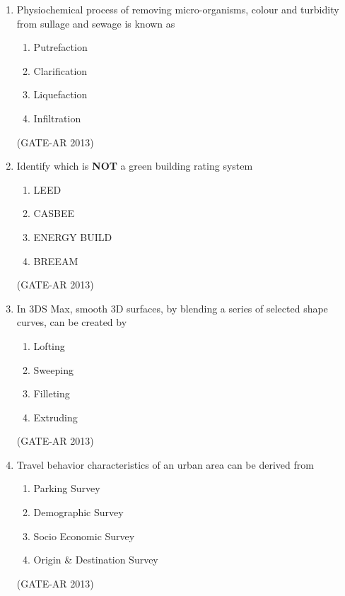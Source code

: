 \documentclass[a4paper,10pt]{article}
\begin{document}
\begin{enumerate}
    \item Physiochemical process of removing micro-organisms, colour and turbidity from sullage and sewage is known as 
    \begin{multicols}{2}
	\begin{enumerate}
        \item Putrefaction
        \item Clarification
        \item Liquefaction
        \item Infiltration
    \end{enumerate}
	\end{multicols}
    \hfill (GATE-AR 2013)

    \item Identify which is \textbf{NOT} a green building rating system 
    \begin{multicols}{4}
	\begin{enumerate}
        \item LEED
        \item CASBEE
        \item ENERGY BUILD
        \item BREEAM
    \end{enumerate}
	\end{multicols}
    \hfill (GATE-AR 2013)

    \item In 3DS Max, smooth 3D surfaces, by blending a series of selected shape curves, can be created by 
    \begin{multicols}{4}
	\begin{enumerate}
        \item Lofting
        \item Sweeping
        \item Filleting
        \item Extruding
    \end{enumerate}
	\end{multicols}
    \hfill (GATE-AR 2013)

    \item Travel behavior characteristics of an urban area can be derived from 
    \begin{multicols}{2}
	\begin{enumerate}
        \item Parking Survey
        \item Demographic Survey
        \item Socio Economic Survey
        \item Origin \& Destination Survey
    \end{enumerate}
	\end{multicols}
    \hfill (GATE-AR 2013)


\end{enumerate}
\end{document}
